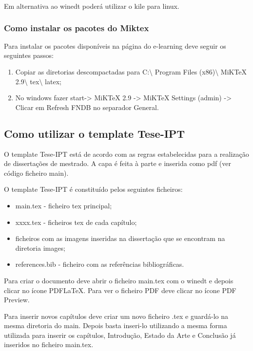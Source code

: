 Em alternativa ao winedt poderá utilizar o kile para linux.


\subsubsection{Como instalar os pacotes do Miktex}
Para instalar os pacotes disponíveis na página do e-learning deve seguir os seguintes passos:
\begin{enumerate}
  \item Copiar as diretorias descompactadas para C:$\setminus$ Program Files (x86)$\setminus$ MiKTeX 2.9$\setminus$ tex$\setminus$ latex;
  \item No windows fazer start-> MiKTeX 2.9 -> MiKTeX Settings (admin) -> Clicar em Refresh FNDB no separador General.
\end{enumerate}

\subsection{Como utilizar o template Tese-IPT}
O template Tese-IPT está de acordo com as regras estabelecidas para a realização de dissertações de mestrado. A capa é feita à parte e inserida como pdf (ver código ficheiro main).

O template Tese-IPT é constituído pelos seguintes ficheiros:
\begin{itemize}
  \item main.tex - ficheiro tex principal;
  \item xxxx.tex - ficheiros tex de cada capítulo;
  \item ficheiros com as imagens inseridas na dissertação que se encontram na diretoria images;
  \item references.bib - ficheiro com as referências bibliográficas.
\end{itemize}
Para criar o documento deve abrir o ficheiro main.tex com o winedt e depois clicar no ícone PDFLaTeX. Para ver o ficheiro PDF deve clicar no ícone PDF Preview.

Para inserir novos capítulos deve criar um novo ficheiro .tex e guardá-lo na mesma diretoria do main. Depois basta inseri-lo utilizando a mesma forma utilizada para inserir os capítulos, Introdução, Estado da Arte e Conclusão já inseridos no ficheiro main.tex.


